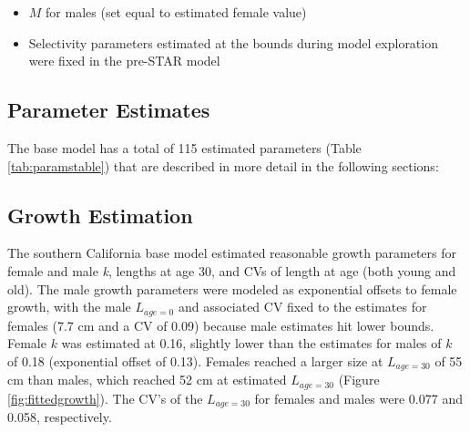 \documentclass[11pt,
  english,
]{article}
\begin{document}
\begin{itemize}
\item

  {\(M\)\leavevmode\tagmcend\tagstructend} for males (set equal to estimated female value)

  \tagmcend\tagstructend\tagstructend
\item

  Selectivity parameters estimated at the bounds during model exploration were fixed in the pre-STAR model

  \tagmcend\tagstructend\tagstructend
\end{itemize}

\tagstructend


\hypertarget{parameter-estimates}{%
\subsection{Parameter Estimates}\label{parameter-estimates}}

\leavevmode\tagmcend\tagstructend

The base model has a total of 115 estimated parameters (Table \ref{tab:paramstable}) that are described in more detail in the following sections:


\hypertarget{growth-estimation}{%
\subsection{Growth Estimation}\label{growth-estimation}}

\leavevmode\tagmcend\tagstructend

The southern California base model estimated reasonable growth parameters for female and male \emph{k}, lengths at age 30, and CVs of length at age (both young and old). The male growth parameters were modeled as exponential offsets to female growth, with the male {\(L_{age=0}\)\leavevmode\tagmcend\tagstructend} and associated CV fixed to the estimates for females (7.7 cm and a CV of 0.09) because male estimates hit lower bounds. Female {\(k\)\leavevmode\tagmcend\tagstructend} was estimated at 0.16, slightly lower than the estimates for males of {\(k\)\leavevmode\tagmcend\tagstructend} of 0.18 (exponential offset of 0.13). Females reached a larger size at {\(L_{age=30}\)\leavevmode\tagmcend\tagstructend} of 55 cm than males, which reached 52 cm at estimated {\(L_{age=30}\)\leavevmode\tagmcend\tagstructend} (Figure \ref{fig:fittedgrowth}). The CV's of the {\(L_{age=30}\)\leavevmode\tagmcend\tagstructend} for females and males were 0.077 and 0.058, respectively.
\end{document}
